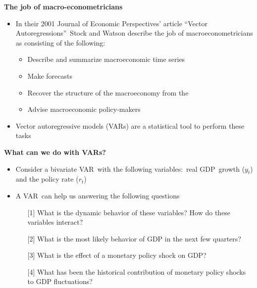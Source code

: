 \documentclass[10pt,english,t,aspectratio=169,ignorenonframetext]{beamer}
\DeclareRobustCommand{\augiefamily}{%
  \fontfamily{augie}\fontseries{b}\fontshape{n}\selectfont}
\begin{document}
\begin{frame}
{\textbf{The job of macro-econometricians}}\bigskip \bigskip \medskip

\begin{itemize}
\item In their 2001 Journal of Economic Perspectives' article
\textquotedblleft Vector Autoregressions\textquotedblright\ Stock and Watson
describe the job of macroeconometricians as consisting of the
following:\smallskip

\begin{itemize}
\item Describe and summarize macroeconomic time series\medskip

\item Make forecasts\medskip

\item Recover the structure of the macroeconomy from the {%
}\medskip

\item Advise macroeconomic policy-makers\bigskip \pause
\end{itemize}

\item Vector autoregressive models (VARs) are a statistical tool to perform
these tasks
\end{itemize}

\end{frame}


\begin{frame}
{\textbf{What can we do with VARs?}}\bigskip \bigskip \medskip

\begin{itemize}
\item Consider a bivariate VAR\ with the following variables:\ real GDP\
growth ($y_{t}$) and the policy rate ($r_{t}$)\bigskip \medskip \pause

\item A VAR\ can help us answering the following questions\smallskip

\begin{enumerate}
\item[{[1]}] What is the dynamic behavior of these variables? How do these
variables interact?\medskip

\item[{[2]}] What is the most likely behavior of GDP in the next few
quarters? \medskip

\item[{[3]}] What is the effect of a monetary policy shock on GDP?\medskip

\item[{[4]}] What has been the historical contribution of monetary policy
shocks to GDP fluctuations?
\end{enumerate}
\end{itemize}
\end{frame}
\end{document}
